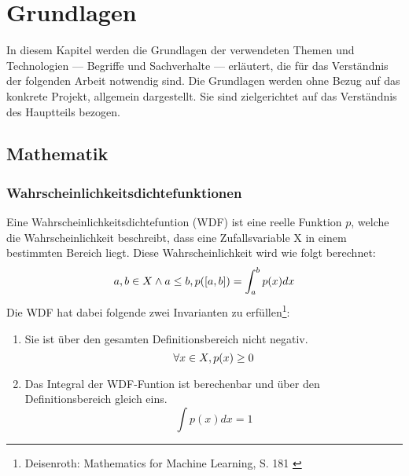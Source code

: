 \chapter{Grundlagen}

In diesem Kapitel werden die Grundlagen der verwendeten Themen und Technologien --- Begriffe und Sachverhalte --- erläutert, die für das Verständnis der folgenden Arbeit notwendig sind.
Die Grundlagen werden ohne Bezug auf das konkrete Projekt, allgemein dargestellt. Sie sind zielgerichtet auf das Verständnis des Hauptteils bezogen.



\section{Mathematik}

\subsection{Wahrscheinlichkeitsdichtefunktionen}
Eine Wahrscheinlichkeitsdichtefuntion (WDF) ist eine reelle Funktion $p$, welche die Wahrscheinlichkeit beschreibt, dass eine Zufallsvariable X in einem bestimmten Bereich liegt. Diese Wahrscheinlichkeit wird wie folgt berechnet:
\begin{equation}
    a,b \in X \land a \le b, \space p([a, b]) = \int_a^b p(x) dx
\end{equation}
Die WDF hat dabei folgende zwei Invarianten zu erfüllen\footnote{
    Deisenroth: Mathematics for Machine Learning, S. 181
    \cite{Deisenroth2020}
}:
\begin{enumerate}
    \item Sie ist über den gesamten Definitionsbereich nicht negativ. 
    \begin{equation}
        \forall x \in X, \space p(x) \ge 0
    \end{equation}
    \item Das Integral der WDF-Funtion ist berechenbar und über den Definitionsbereich gleich eins.
    \begin{equation}
        \int p(x) dx = 1
    \end{equation}
\end{enumerate}

